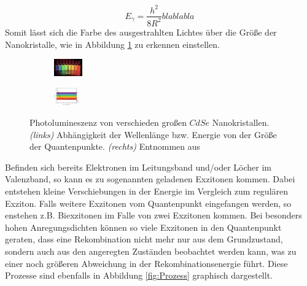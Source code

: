       \begin{equation}
        E_\gamma = \frac{h^2}{8R^2} blablabla
      \end{equation}
      Somit lässt sich die Farbe des ausgestrahlten Lichtes über die Größe der Nanokristalle, wie in Abbildung \ref{fig:Farbe} zu erkennen einstellen.
      \begin{figure}[h]
        \begin{subfigure}{0.48\textwidth}
          \centering
          \includegraphics[height=0.75cm]{pictures/Farbe.png}
        \end{subfigure}
        \hfill
        \begin{subfigure}{0.48\textwidth}
          \centering
          \includegraphics[height=0.75cm]{pictures/Farbe2.png}
        \end{subfigure}
        \caption{Photolumineszenz von verschieden großen $CdSe$ Nanokristallen. \textit{(links)} Abhängigkeit der Wellenlänge bzw. Energie von der Größe der Quantenpunkte. \textit{(rechts)} Entnommen aus \cite{tu_dortmund_versuchsanleitung_2021-6}}
        \label{fig:Farbe}
      \end{figure}      Befinden sich bereits Elektronen im Leitungsband und/oder Löcher im Valenzband, so kann es zu sogenannten geladenen Exzitonen kommen. Dabei entstehen kleine Verschiebungen in der Energie im Vergleich zum regulären Exziton.
      Falls weitere Exzitonen vom Quantenpunkt eingefangen werden, so enstehen z.B. Biexzitonen im Falle von zwei Exzitonen kommen. Bei besonders hohen Anregungsdichten können so viele Exzitonen in den Quantenpunkt geraten, dass eine Rekombination nicht mehr nur aus dem Grundzustand, sondern auch aus den angeregten Zuständen beobachtet werden kann, was zu einer noch größeren Abweichung in der Rekombinationsenergie führt. Diese Prozesse sind ebenfalls in Abbildung \ref{fig:Prozess} graphisch dargestellt.

